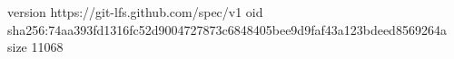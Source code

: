 version https://git-lfs.github.com/spec/v1
oid sha256:74aa393fd1316fc52d9004727873c6848405bee9d9faf43a123bdeed8569264a
size 11068
